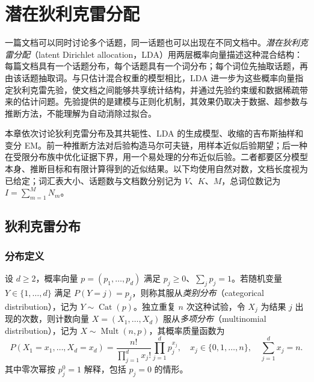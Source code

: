 \setcounter{chapter}{19} %
\chapter{潜在狄利克雷分配}
\label{ch:lh-lda}

一篇文档可以同时讨论多个话题，同一话题也可以出现在不同文档中。\emph{潜在狄利克雷分配}（latent Dirichlet allocation，LDA）用两层概率向量描述这种混合结构：每篇文档具有一个话题分布，每个话题具有一个词分布；每个词位先抽取话题，再由该话题抽取词。与只估计混合权重的模型相比，LDA 进一步为这些概率向量指定狄利克雷先验，使文档之间能够共享统计结构，并通过先验约束缓和数据稀疏带来的估计问题。先验提供的是建模与正则化机制，其效果仍取决于数据、超参数与推断方法，不能理解为自动消除过拟合。

本章依次讨论狄利克雷分布及其共轭性、LDA 的生成模型、收缩的吉布斯抽样和变分 EM。前一种推断方法对后验构造马尔可夫链，用样本近似后验期望；后一种在受限分布族中优化证据下界，用一个易处理的分布近似后验。二者都要区分模型本身、推断目标和有限计算得到的近似结果。以下均使用自然对数，文档长度视为已给定；词汇表大小、话题数与文档数分别记为 $V$、$K$、$M$，总词位数记为 $I=\sum_{m=1}^M N_m$。

\section{狄利克雷分布}
\label{sec:lh-lda-dirichlet}

\subsection{分布定义}
\label{subsec:lh-lda-dirichlet-definition}

\begin{definition}[类别分布与多项分布]
\label{def:lh-lda-categorical-multinomial}
设 $d\geq2$，概率向量 $p=(p_1,\ldots,p_d)$ 满足 $p_j\geq0$、$\sum_jp_j=1$。若随机变量 $Y\in\{1,\ldots,d\}$ 满足 $P(Y=j)=p_j$，则称其服从\emph{类别分布}（categorical distribution），记为 $Y\sim\operatorname{Cat}(p)$。独立重复 $n$ 次这种试验，令 $X_j$ 为结果 $j$ 出现的次数，则计数向量 $X=(X_1,\ldots,X_d)$ 服从\emph{多项分布}（multinomial distribution），记为 $X\sim\operatorname{Mult}(n,p)$，其概率质量函数为
\begin{equation}
P(X_1=x_1,\ldots,X_d=x_d)
=\frac{n!}{\prod_{j=1}^d x_j!}\prod_{j=1}^d p_j^{x_j},
\quad x_j\in\{0,1,\ldots,n\},\quad\sum_{j=1}^d x_j=n.
\label{eq:lh-lda-multinomial}
\end{equation}
其中零次幂按 $p_j^0=1$ 解释，包括 $p_j=0$ 的情形。
\end{definition}

